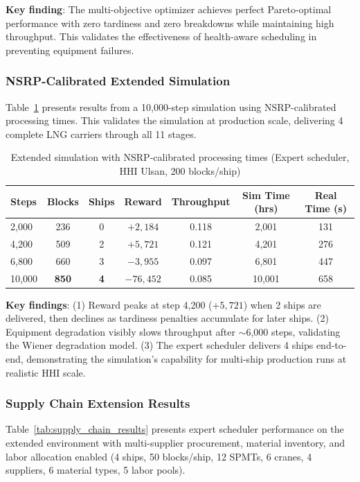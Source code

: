 \documentclass[11pt,a4paper]{article}
\begin{document}
\textbf{Key finding}: The multi-objective optimizer achieves perfect Pareto-optimal performance with zero tardiness and zero breakdowns while maintaining high throughput. This validates the effectiveness of health-aware scheduling in preventing equipment failures.

\subsubsection{NSRP-Calibrated Extended Simulation}

Table~\ref{tab:nsrp_extended} presents results from a 10,000-step simulation using NSRP-calibrated processing times. This validates the simulation at production scale, delivering 4 complete LNG carriers through all 11 stages.

\begin{table}[h]
\centering
\caption{Extended simulation with NSRP-calibrated processing times (Expert scheduler, HHI Ulsan, 200 blocks/ship)}
\label{tab:nsrp_extended}
\begin{tabular}{lcccccc}
\toprule
Steps & Blocks & Ships & Reward & Throughput & Sim Time (hrs) & Real Time (s) \\
\midrule
2,000 & 236 & 0 & $+2{,}184$ & 0.118 & 2,001 & 131 \\
4,200 & 509 & 2 & $+5{,}721$ & 0.121 & 4,201 & 276 \\
6,800 & 660 & 3 & $-3{,}955$ & 0.097 & 6,801 & 447 \\
10,000 & \textbf{850} & \textbf{4} & $-76{,}452$ & 0.085 & 10,001 & 658 \\
\bottomrule
\end{tabular}
\end{table}

\textbf{Key findings}: (1) Reward peaks at step 4,200 ($+5{,}721$) when 2 ships are delivered, then declines as tardiness penalties accumulate for later ships. (2) Equipment degradation visibly slows throughput after $\sim$6,000 steps, validating the Wiener degradation model. (3) The expert scheduler delivers 4 ships end-to-end, demonstrating the simulation's capability for multi-ship production runs at realistic HHI scale.

\subsubsection{Supply Chain Extension Results}

Table~\ref{tab:supply_chain_results} presents expert scheduler performance on the extended environment with multi-supplier procurement, material inventory, and labor allocation enabled (4 ships, 50 blocks/ship, 12 SPMTs, 6 cranes, 4 suppliers, 6 material types, 5 labor pools).
\end{document}
